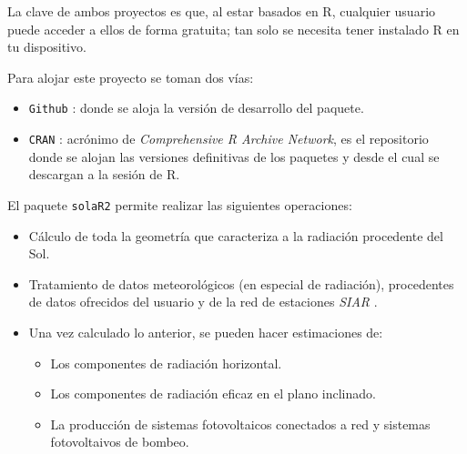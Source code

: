 La clave de ambos proyectos es que, al estar basados en R, cualquier usuario puede acceder a ellos de forma gratuita; tan solo se necesita tener instalado R en tu dispositivo.

Para alojar este proyecto se toman dos vías:
\begin{itemize}
\item \texttt{Github} \cite{github}: donde se aloja la versión de desarrollo del paquete.
\item \texttt{CRAN} \cite{cran}: acrónimo de \emph{Comprehensive R Archive Network}, es el repositorio donde se alojan las versiones definitivas de los paquetes y desde el cual se descargan a la sesión de R.
\end{itemize}

El paquete \texttt{solaR2} permite realizar las siguientes operaciones:
\begin{itemize}
\item Cálculo de toda la geometría que caracteriza a la radiación procedente del Sol.
\item Tratamiento de datos meteorológicos (en especial de radiación), procedentes de datos ofrecidos del usuario y de la red de estaciones \emph{SIAR} \cite{siar23}.
\item Una vez calculado lo anterior, se pueden hacer estimaciones de:
\begin{itemize}
\item Los componentes de radiación horizontal.
\item Los componentes de radiación eficaz en el plano inclinado.
\item La producción de sistemas fotovoltaicos conectados a red y sistemas fotovoltaivos de bombeo.
\end{itemize}
\end{itemize}

